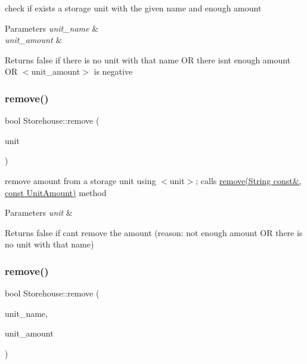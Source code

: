 check if exists a storage unit with the given name and enough amount 
\begin{DoxyParams}{Parameters}
{\em unit\+\_\+name} & \\
\hline
{\em unit\+\_\+amount} & \\
\hline
\end{DoxyParams}
\begin{DoxyReturn}{Returns}
false if there is no unit with that name OR there isn\textquotesingle{}t enough amount OR $<$unit\+\_\+amount$>$ is negative 
\end{DoxyReturn}
\mbox{\label{classStorehouse_abce48d8f965079715a4c93f1702ffcbf}} 
\subsubsection{\texorpdfstring{remove()}{remove()}\hspace{0.1cm}{\footnotesize\ttfamily [1/2]}}
{\footnotesize\ttfamily bool Storehouse\+::remove (\begin{DoxyParamCaption}\item[{const \hyperlink{classStorageUnit}{Storage\+Unit} \&}]{unit }\end{DoxyParamCaption})}

remove amount from a storage unit using $<$unit$>$; calls \hyperlink{classStorehouse_a1c65143fca17ea7fda18e0b9b10b4d70}{remove(\+String const\&, const Unit\+Amount)} method 
\begin{DoxyParams}{Parameters}
{\em unit} & \\
\hline
\end{DoxyParams}
\begin{DoxyReturn}{Returns}
false if can\textquotesingle{}t remove the amount (reason\+: not enough amount OR there is no unit with that name) 
\end{DoxyReturn}
\mbox{\label{classStorehouse_a1c65143fca17ea7fda18e0b9b10b4d70}} 
\subsubsection{\texorpdfstring{remove()}{remove()}\hspace{0.1cm}{\footnotesize\ttfamily [2/2]}}
{\footnotesize\ttfamily bool Storehouse\+::remove (\begin{DoxyParamCaption}\item[{\hyperlink{classString}{String} const \&}]{unit\+\_\+name,  }\item[{const \hyperlink{StorageUnit_8hpp_a13b2ba6b0400e1aa0b57282bd1228f20}{Unit\+Amount}}]{unit\+\_\+amount }\end{DoxyParamCaption})}

